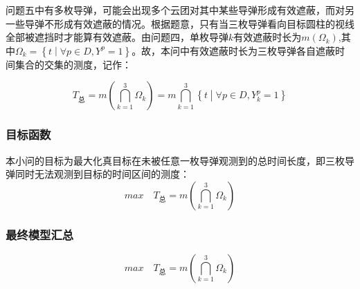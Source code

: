\documentclass[withoutpreface,bwprint]{cumcmthesis}
\numberwithin{equation}{section} %
\numberwithin{figure}{section} %
\numberwithin{table}{section}  %
\begin{document}

问题五中有多枚导弹，可能会出现多个云团对其中某些导弹形成有效遮蔽，而对另一些导弹不形成有效遮蔽的情况。根据题意，只有当三枚导弹看向目标圆柱的视线全部被遮挡时才能算有效遮蔽。由问题四，单枚导弹$k$有效遮蔽时长为$m(\Omega_k)$,其中$\Omega_k =\left\{ t\middle| \forall p\in D,Y^{p}=1 \right\}$。故，本问中有效遮蔽时长为三枚导弹各自遮蔽时间集合的交集的测度，记作：

\begin{equation}
    T_\text{总}=m(\bigcap_{k=1}^3 \Omega_{k})=m\bigcap_{k=1}^3 \left\{ t\middle| \forall p\in D,Y^{p}_{k}=1 \right\}
\end{equation}

\vspace{-1em}
\subsubsection{目标函数}
本小问的目标为最大化真目标在未被任意一枚导弹观测到的总时间长度，即三枚导弹同时无法观测到目标的时间区间的测度：
\begin{equation}
    \textit{max}\quad T_{\text{总}} = m(\bigcap_{k=1}^3 \Omega_{k})
\end{equation}

\newpage
\vspace{-1em}
\subsubsection{最终模型汇总}
\vspace{-1em}
\[
    \textit{max}\quad T_{\text{总}} = m(\bigcap_{k=1}^3 \Omega_{k})
\]
\end{document}
